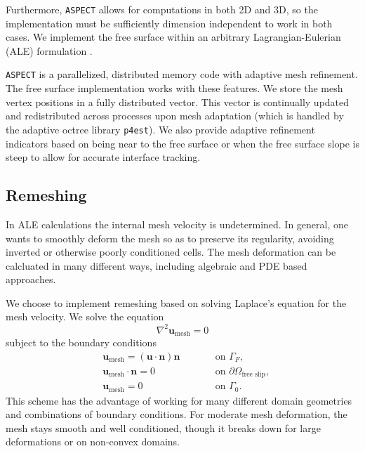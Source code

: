 \documentclass[preprint,12pt,authoryear]{elsarticle}
\begin{document}
Furthermore, \texttt{ASPECT} allows for computations in both 2D and 3D, so the implementation must be sufficiently dimension
independent to work in both cases. We implement the free surface within an arbitrary Lagrangian-Eulerian (ALE) formulation
\citep[e.g][]{fullsack1995arbitrary,donea2004encyclopedia}.

\texttt{ASPECT} is a parallelized, distributed memory code with adaptive mesh refinement.
The free surface implementation works with these features.  We store the mesh vertex positions 
in a fully distributed vector. This vector is continually updated and redistributed across 
processes upon mesh adaptation (which is handled by the adaptive octree library \texttt{p4est}).
We also provide adaptive refinement indicators based on being near to the free surface or 
when the free surface slope is steep to allow for accurate interface tracking.


\subsection{Remeshing}
\label{sec:remeshing}

In ALE calculations the internal mesh velocity is undetermined.
In general, one wants to smoothly deform the mesh so as to preserve its regularity, 
avoiding inverted or otherwise poorly conditioned cells.
The mesh deformation can be calcluated in many different ways, including algebraic \citep[e.g.][]{thieulot2011fantom} 
and PDE based approaches.

We choose to implement remeshing based on solving Laplace's equation for the mesh velocity.
We solve the equation
\begin{equation}
\nabla^2 \mathbf{u}_{\mathrm{mesh}} = 0
\label{eq:laplacian_smoothing}
\end{equation}
subject to the boundary conditions
\begin{equation}
\begin{aligned}
&\mathbf{u}_\mathrm{mesh} = \left( \textbf{u} \cdot \textbf{n} \right) \textbf{n} & \qquad & \textrm{on } \Gamma_F, \\
&\mathbf{u}_\mathrm{mesh} \cdot \textbf{n} = 0 & \qquad & \textrm{on } \partial \Omega_{\textrm{free slip}}, \\
&\mathbf{u}_\mathrm{mesh} = 0 & \qquad & \textrm{on } \Gamma_0.
\end{aligned}
\label{eq:laplacian_bcs}
\end{equation}
This scheme has the advantage of working for many different domain geometries and combinations of boundary conditions.
For moderate mesh deformation, the mesh stays smooth and well conditioned, though it breaks down for large deformations 
or on non-convex domains.
\end{document}
